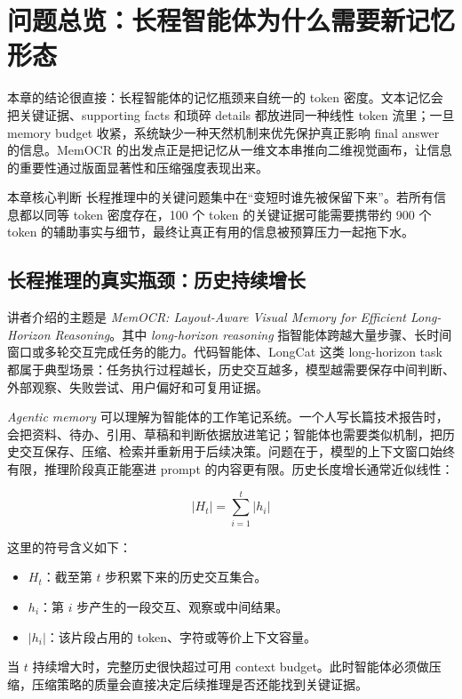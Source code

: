 \section{问题总览：长程智能体为什么需要新记忆形态}

本章的结论很直接：长程智能体的记忆瓶颈来自统一的 token 密度。文本记忆会把关键证据、supporting facts 和琐碎 details 都放进同一种线性 token 流里；一旦 memory budget 收紧，系统缺少一种天然机制来优先保护真正影响 final answer 的信息。MemOCR 的出发点正是把记忆从一维文本串推向二维视觉画布，让信息的重要性通过版面显著性和压缩强度表现出来。

\begin{importantbox}{本章核心判断}
长程推理中的关键问题集中在“变短时谁先被保留下来”。若所有信息都以同等 token 密度存在，100 个 token 的关键证据可能需要携带约 900 个 token 的辅助事实与细节，最终让真正有用的信息被预算压力一起拖下水。
\end{importantbox}

\subsection{长程推理的真实瓶颈：历史持续增长}

讲者介绍的主题是 \textit{MemOCR: Layout-Aware Visual Memory for Efficient Long-Horizon Reasoning}。其中 \textit{long-horizon reasoning} 指智能体跨越大量步骤、长时间窗口或多轮交互完成任务的能力。代码智能体、LongCat 这类 long-horizon task 都属于典型场景：任务执行过程越长，历史交互越多，模型越需要保存中间判断、外部观察、失败尝试、用户偏好和可复用证据。

\textit{Agentic memory} 可以理解为智能体的工作笔记系统。一个人写长篇技术报告时，会把资料、待办、引用、草稿和判断依据放进笔记；智能体也需要类似机制，把历史交互保存、压缩、检索并重新用于后续决策。问题在于，模型的上下文窗口始终有限，推理阶段真正能塞进 prompt 的内容更有限。历史长度增长通常近似线性：

$$
|H_t| = \sum_{i=1}^{t} |h_i|
$$

这里的符号含义如下：

\begin{itemize}
  \item $H_t$：截至第 $t$ 步积累下来的历史交互集合。
  \item $h_i$：第 $i$ 步产生的一段交互、观察或中间结果。
  \item $|h_i|$：该片段占用的 token、字符或等价上下文容量。
\end{itemize}

当 $t$ 持续增大时，完整历史很快超过可用 context budget。此时智能体必须做压缩，压缩策略的质量会直接决定后续推理是否还能找到关键证据。

